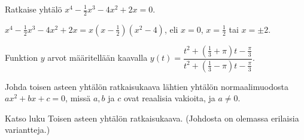 \begin{tehtava} %
Ratkaise yhtälö $x^4-\frac{1}{2}x^3-4x^2+2x=0$.
	\begin{vastaus}	
$x^4-\frac{1}{2}x^3-4x^2+2x=x(x-\frac{1}{2})(x^2-4)$, eli $x=0$, $x=\frac{1}{2}$ tai $x=\pm 2$.
	\end{vastaus}
\end{tehtava}

\begin{tehtava}
Funktion $y$ arvot määritellään kaavalla $y(t)=\dfrac{t^2+\left(\frac{1}{3}+\pi\right)t-\frac{\pi}{3}}{t^2+\left(\frac{1}{3}-\pi\right)t-\frac{\pi}{3}}$.
		\begin{vastaus}
		\end{vastaus}
\end{tehtava}

\begin{tehtava}
Johda toisen asteen yhtälön ratkaisukaava lähtien yhtälön normaalimuodosta $ax^2+bx+c=0$, missä $a, b$ ja $c$ ovat reaalisia vakioita, ja $a \neq 0$.
	\begin{vastaus}
	Katso luku Toisen asteen yhtälön ratkaisukaava. (Johdosta on olemassa erilaisia variantteja.)
	\end{vastaus}
\end{tehtava}

\newpage


